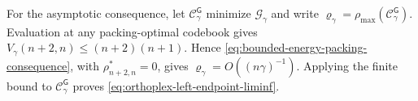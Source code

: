 \documentclass[12pt,draftclsnofoot,onecolumn]{IEEEtran}
\newcommand{\cC}{\mathcal{C}}
\newcommand{\cG}{\mathcal{G}}
\theoremstyle{definition}
\begin{document}
\begin{IEEEproof}
For the asymptotic consequence, let \(\cC_\gamma^{\mathsf G}\) minimize
\(\cG_\gamma\) and write
\(\varrho_\gamma=\rho_{\max}(\cC_\gamma^{\mathsf G})\).  Evaluation at
any packing-optimal codebook gives
\(V_\gamma(n+2,n)\le(n+2)(n+1)\).  Hence
\eqref{eq:bounded-energy-packing-consequence}, with
\(\rho^{\ast}_{n+2,n}=0\), gives
\(\varrho_\gamma=O((n\gamma)^{-1})\).  Applying the finite bound to
\(\cC_\gamma^{\mathsf G}\) proves
\eqref{eq:orthoplex-left-endpoint-liminf}.
\end{IEEEproof}




\end{document}
